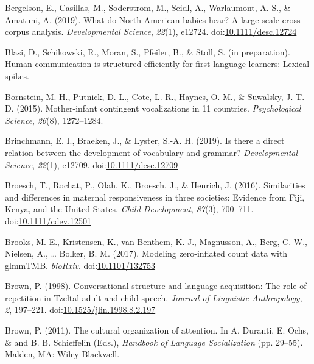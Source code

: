 \documentclass[floatsintext,man]{apa6}
\theoremstyle{definition}
\theoremstyle{definition}
\theoremstyle{definition}
\theoremstyle{remark}
\begin{document}
\hypertarget{ref-bergelsoncasillas2019what}{}
Bergelson, E., Casillas, M., Soderstrom, M., Seidl, A., Warlaumont, A.
S., \& Amatuni, A. (2019). What do North American babies hear? A
large-scale cross-corpus analysis. \emph{Developmental Science},
\emph{22}(1), e12724.
doi:\href{https://doi.org/10.1111/desc.12724}{10.1111/desc.12724}

\hypertarget{ref-blasiIPhuman}{}
Blasi, D., Schikowski, R., Moran, S., Pfeiler, B., \& Stoll, S. (in
preparation). Human communication is structured efficiently for first
language learners: Lexical spikes.

\hypertarget{ref-bornstein2015mother}{}
Bornstein, M. H., Putnick, D. L., Cote, L. R., Haynes, O. M., \&
Suwalsky, J. T. D. (2015). Mother-infant contingent vocalizations in 11
countries. \emph{Psychological Science}, \emph{26}(8), 1272--1284.

\hypertarget{ref-brinchmann2019direct}{}
Brinchmann, E. I., Braeken, J., \& Lyster, S.-A. H. (2019). Is there a
direct relation between the development of vocabulary and grammar?
\emph{Developmental Science}, \emph{22}(1), e12709.
doi:\href{https://doi.org/10.1111/desc.12709}{10.1111/desc.12709}

\hypertarget{ref-broesch2016similarities}{}
Broesch, T., Rochat, P., Olah, K., Broesch, J., \& Henrich, J. (2016).
Similarities and differences in maternal responsiveness in three
societies: Evidence from Fiji, Kenya, and the United States. \emph{Child
Development}, \emph{87}(3), 700--711.
doi:\href{https://doi.org/10.1111/cdev.12501}{10.1111/cdev.12501}

\hypertarget{ref-brooks2017modeling}{}
Brooks, M. E., Kristensen, K., van Benthem, K. J., Magnusson, A., Berg,
C. W., Nielsen, A., \ldots{} Bolker, B. M. (2017). Modeling
zero-inflated count data with glmmTMB. \emph{bioRxiv}.
doi:\href{https://doi.org/10.1101/132753}{10.1101/132753}

\hypertarget{ref-brown1998conversational}{}
Brown, P. (1998). Conversational structure and language acquisition: The
role of repetition in Tzeltal adult and child speech. \emph{Journal of
Linguistic Anthropology}, \emph{2}, 197--221.
doi:\href{https://doi.org/10.1525/jlin.1998.8.2.197}{10.1525/jlin.1998.8.2.197}

\hypertarget{ref-brown2011cultural}{}
Brown, P. (2011). The cultural organization of attention. In A. Duranti,
E. Ochs, \& and B. B. Schieffelin (Eds.), \emph{Handbook of Language
Socialization} (pp. 29--55). Malden, MA: Wiley-Blackwell.
\end{document}
